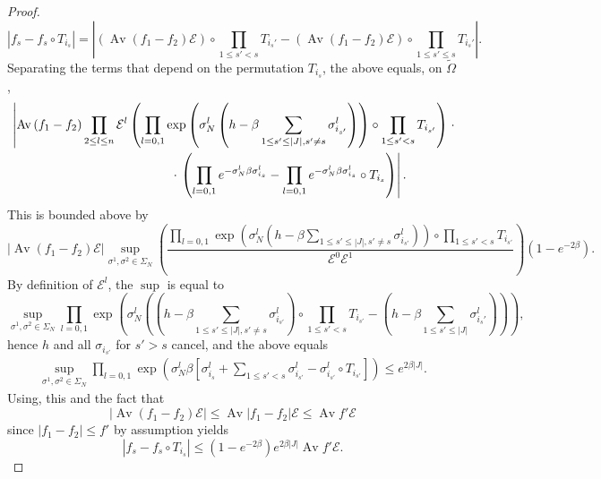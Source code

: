 \documentclass[a4paper,12pt,oneside,reqno]{amsart}
\numberwithin{equation}{section}
\begin{document}
\begin{proof}
$$\left|f_s-f_s\circ T_{i_s} \right| = \left|(\operatorname{Av} \left(f_1-f_2 \right) \mathcal{E})\circ \prod\limits_{1\leq s' < s} T_{i_s'}-(\operatorname{Av} \left(f_1-f_2 \right) \mathcal{E})\circ \prod\limits_{1\leq s' \leq s} T_{i_s'}\right|.$$
Separating the terms that depend on the permutation $T_{i_s}$, the above equals, on $\tilde  \Omega$,
\begin{equation} \begin{aligned}
& \left|\operatorname{Av} \left(f_1-f_2 \right) \prod\limits_{2\leq l\leq n} \mathcal{E}^l \left( \prod\limits_{l=0,1}\exp\left(\sigma^l_N \left(h-\beta\sum\limits_{1\leq s'\leq |J|,s'\neq s} \sigma_{i_{s'}}^l \right) \right)\circ \prod\limits_{1\leq s' < s} T_{i_{s'}} \right) \right.\cdot \\
& \hspace{4.5cm} \cdot \left.\left( \prod\limits_{l=0,1}e^{-\sigma^l_N \beta \sigma_{i_{s}}^l} -\prod\limits_{l=0,1}e^{-\sigma^l_N \beta \sigma_{i_{s}}^l}\circ  T_{i_{s}}\right)\right|.
\end{aligned}\end{equation}
This is bounded above by
$$ \left|\operatorname{Av} \left(f_1-f_2 \right)  \mathcal{E}\right| \sup\limits_{\sigma^1,\sigma^2\in \Sigma_N}\left(\frac{\prod\limits_{l=0,1}\exp\left(\sigma^l_N \left(h-\beta\sum\limits_{1\leq s'\leq |J|,s'\neq s} \sigma_{i_{s'}}^l \right) \right)\circ \prod\limits_{1\leq s' < s} T_{i_{s'}}}{\mathcal{E}^0 \mathcal{E}^1}\right) \left(1-e^{-2\beta}\right).$$
By  definition of $\mathcal{E}^l$, the $\sup$  is equal to
\[
\sup\limits_{\sigma^1,\sigma^2\in \Sigma_N} \prod\limits_{l=0,1}\exp\left(\sigma^l_N \left(\left(h-\beta\sum\limits_{1\leq s'\leq |J|,s'\neq s} \sigma_{i_{s'}}^l \right)\circ \prod\limits_{1\leq s' < s} T_{i_{s'}} - \left(h-\beta\sum\limits_{1\leq s'\leq |J|} \sigma_{i_s'}^l\right)\right) \right), 
\]
hence $h$ and all $\sigma_{i_{s'}}$ for $s'>s$ cancel, and the above equals
\[ \begin{aligned}
\sup\limits_{\sigma^1,\sigma^2\in \Sigma_N}\prod\limits_{l=0,1}\exp\left(\sigma^l_N \beta \left[\sigma_{i_{s}}^l+ \sum\limits_{1\leq s' < s} \sigma_{i_{s'}}^l-\sigma_{i_{s'}}^l\circ T_{i_{s'}} \right] \right) \leq e^{2\beta |J|}.
\end{aligned} \] 
Using, this and the fact that
$$ \left|\operatorname{Av} \left(f_1-f_2 \right) \mathcal{E}\right| \leq \operatorname{Av} \left|f_1-f_2 \right| \mathcal{E}\leq \operatorname{Av} f'  \mathcal{E} $$
since $\left|f_1-f_2\right|\leq f' $ by assumption yields 
$$ \left|f_s-f_s\circ T_{i_s} \right| \leq  \left(1-e^{-2\beta}\right)e^{2\beta |J|} \operatorname{Av} f'  \mathcal{E}.$$

\end{proof}
\end{document}
